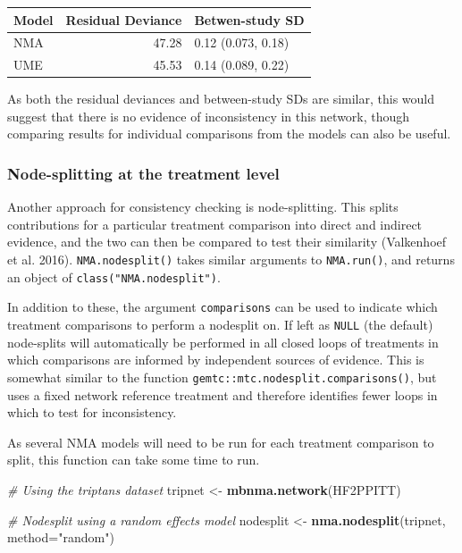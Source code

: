 \documentclass[]{article}
\newenvironment{Shaded}{\begin{snugshade}}{\end{snugshade}}
\newcommand{\CommentTok}[1]{\textcolor[rgb]{0.56,0.35,0.01}{\textit{#1}}}
\newcommand{\DataTypeTok}[1]{\textcolor[rgb]{0.13,0.29,0.53}{#1}}
\newcommand{\KeywordTok}[1]{\textcolor[rgb]{0.13,0.29,0.53}{\textbf{#1}}}
\newcommand{\NormalTok}[1]{#1}
\newcommand{\StringTok}[1]{\textcolor[rgb]{0.31,0.60,0.02}{#1}}
\begin{document}
\begin{longtable}[]{@{}lrl@{}}
\toprule
Model & Residual Deviance & Betwen-study SD\tabularnewline
\midrule
\endhead
NMA & 47.28 & 0.12 (0.073, 0.18)\tabularnewline
UME & 45.53 & 0.14 (0.089, 0.22)\tabularnewline
\bottomrule
\end{longtable}

As both the residual deviances and between-study SDs are similar, this
would suggest that there is no evidence of inconsistency in this
network, though comparing results for individual comparisons from the
models can also be useful.

\hypertarget{node-splitting-at-the-treatment-level}{%
\subsubsection{Node-splitting at the treatment
level}\label{node-splitting-at-the-treatment-level}}

Another approach for consistency checking is node-splitting. This splits
contributions for a particular treatment comparison into direct and
indirect evidence, and the two can then be compared to test their
similarity (Valkenhoef et al. 2016). \texttt{NMA.nodesplit()} takes
similar arguments to \texttt{NMA.run()}, and returns an object of
\texttt{class("NMA.nodesplit")}.

In addition to these, the argument \texttt{comparisons} can be used to
indicate which treatment comparisons to perform a nodesplit on. If left
as \texttt{NULL} (the default) node-splits will automatically be
performed in all closed loops of treatments in which comparisons are
informed by independent sources of evidence. This is somewhat similar to
the function \texttt{gemtc::mtc.nodesplit.comparisons()}, but uses a
fixed network reference treatment and therefore identifies fewer loops
in which to test for inconsistency.

As several NMA models will need to be run for each treatment comparison
to split, this function can take some time to run.

\begin{Shaded}
\begin{Highlighting}[]
\CommentTok{# Using the triptans dataset}
\NormalTok{tripnet <-}\StringTok{ }\KeywordTok{mbnma.network}\NormalTok{(HF2PPITT)}

\CommentTok{# Nodesplit using a random effects model}
\NormalTok{nodesplit <-}\StringTok{ }\KeywordTok{nma.nodesplit}\NormalTok{(tripnet, }\DataTypeTok{method=}\StringTok{"random"}\NormalTok{)}
\end{Highlighting}
\end{Shaded}
\end{document}
